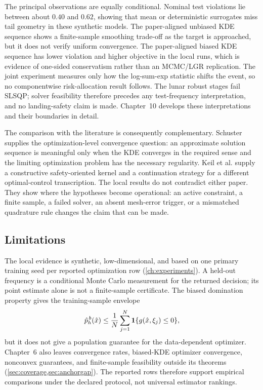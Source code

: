 The principal observations are equally conditional. Nominal test violations lie
between about $0.40$ and $0.62$, showing that mean or deterministic surrogates
miss tail geometry in these synthetic models. The paper-aligned unbiased KDE sequence shows a finite-sample smoothing trade-off as the target is approached,
but it does not verify uniform convergence. The paper-aligned biased KDE sequence has
lower violation and higher objective in the local runs, which is evidence of
one-sided conservatism rather than an MCMC/LGR replication. The joint experiment measures
only how the log-sum-exp statistic shifts the event, so no componentwise
risk-allocation result follows. The lunar robust stages fail SLSQP;
solver feasibility therefore precedes any test-frequency interpretation, and no
landing-safety claim is made. Chapter~10 develops these interpretations and their
boundaries in detail.

The comparison with the literature is consequently complementary. Schuster supplies the optimization-level convergence question: an approximate solution sequence is meaningful only when the KDE converges in the required sense and the limiting optimization problem has the necessary regularity. Keil et al. supply a constructive safety-oriented kernel and a continuation strategy for a different optimal-control transcription. The local results do not contradict either paper. They show where the hypotheses become operational: an active constraint, a finite sample, a failed solver, an absent mesh-error trigger, or a mismatched quadrature rule changes the claim that can be made.

\subsection{Limitations}
\label{sec:conclusion-limitations}

The local evidence is synthetic, low-dimensional, and based on one primary
training seed per reported optimization row (\cref{ch:experiments}). A held-out
frequency is a conditional Monte Carlo measurement for the returned decision;
its point estimate alone is not a finite-sample certificate. The biased
domination property gives the training-sample envelope
\begin{equation}
  \hat p_h^{\,b}(\hat x)
  \leq \frac{1}{N}\sum_{j=1}^{N}
  \mathbf{1}\{g(\hat x,\xi_j)\leq 0\},
  \label{eq:conclusion-training-envelope}
\end{equation}
but it does not give a population guarantee for the data-dependent optimizer.
Chapter~6 also leaves convergence rates, biased-KDE optimizer convergence,
nonconvex guarantees, and finite-sample feasibility outside its theorems
(\cref{sec:coverage,sec:anchorgap}). The reported rows
therefore support empirical comparisons under the declared protocol, not
universal estimator rankings.

